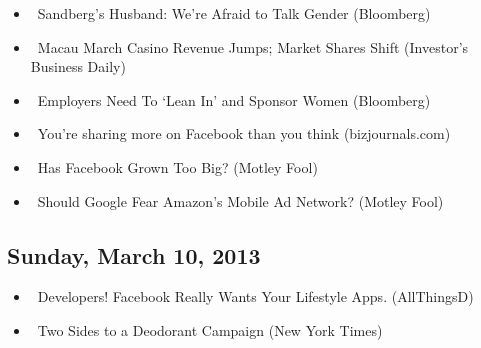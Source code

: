 \documentclass[11pt,asymmetric]{article}
\begin{document}
\begin{itemize}
\item\ Sandberg's Husband: We're Afraid to Talk Gender (Bloomberg)
\item\ Macau March Casino Revenue Jumps; Market Shares Shift (Investor's Business Daily)
\item\ Employers Need To ‘Lean In’ and Sponsor Women (Bloomberg)
\item\ You’re sharing more on Facebook than you think (bizjournals.com)
\item\ Has Facebook Grown Too Big? (Motley Fool)
\item\ Should Google Fear Amazon's Mobile Ad Network? (Motley Fool)
\end{itemize}
\subsection*{Sunday, March 10, 2013}
\begin{itemize}
\item\ Developers! Facebook Really Wants Your Lifestyle Apps. (AllThingsD)
\item\ Two Sides to a Deodorant Campaign (New York Times)
\end{itemize}
\end{document}
